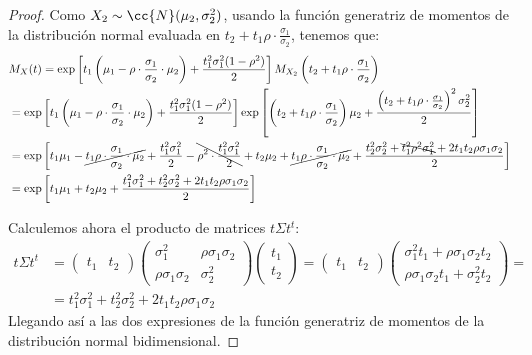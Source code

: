 \begin{proof}
    Como $X_2\sim \cc{N}(\mu_2, \sigma_2^2)$, usando la función generatriz de momentos de la distribución normal evaluada en $t_2+t_1\rho\cdot \frac{\sigma_1}{\sigma_2}$, tenemos que:
    \begin{align*}
        &
        M_X(t)= \exp\left[t_1\left(\mu_1-\rho\cdot \frac{\sigma_1}{\sigma_2}\cdot \mu_2\right)+\dfrac{t_1^2\sigma_1^2(1-\rho^2)}{2}\right]M_{X_2}\left(t_2+t_1\rho\cdot \frac{\sigma_1}{\sigma_2}\right)
        \\&= \exp\left[t_1\left(\mu_1-\rho\cdot \frac{\sigma_1}{\sigma_2}\cdot \mu_2\right)+\dfrac{t_1^2\sigma_1^2(1-\rho^2)}{2}\right]\exp\left[\left(t_2+t_1\rho\cdot \frac{\sigma_1}{\sigma_2}\right)\mu_2+\dfrac{\left(t_2+t_1\rho\cdot \frac{\sigma_1}{\sigma_2}\right)^2\sigma_2^2}{2}\right]
        \\&= \exp\left[t_1\mu_1-\cancel{t_1\rho\cdot \frac{\sigma_1}{\sigma_2}\cdot \mu_2}+\dfrac{t_1^2\sigma_1^2}{2}-\bcancel{\rho^2\cdot \dfrac{t_1^2\sigma_1^2}{2}}+t_2\mu_2+\cancel{t_1\rho\cdot \frac{\sigma_1}{\sigma_2}\cdot \mu_2}+\dfrac{t_2^2\sigma_2^2+\bcancel{t_1^2\rho^2\sigma_1^2}+2t_1t_2\rho\sigma_1\sigma_2}{2}\right]
        \\&= \exp\left[t_1\mu_1+t_2\mu_2+\dfrac{t_1^2\sigma_1^2+t_2^2\sigma_2^2+2t_1t_2\rho\sigma_1\sigma_2}{2}\right]
    \end{align*}

    Calculemos ahora el producto de matrices $t\Sigma t^t$:
    \begin{align*}
        t\Sigma t^t&=\begin{pmatrix}
            t_1 & t_2
        \end{pmatrix}\begin{pmatrix}
            \sigma_1^2 & \rho\sigma_1\sigma_2\\
            \rho\sigma_1\sigma_2 & \sigma_2^2
        \end{pmatrix}\begin{pmatrix}
            t_1\\
            t_2
        \end{pmatrix}
        = \begin{pmatrix}
            t_1 & t_2
        \end{pmatrix}\begin{pmatrix}
            \sigma_1^2t_1+\rho\sigma_1\sigma_2t_2\\
            \rho\sigma_1\sigma_2t_1+\sigma_2^2t_2
        \end{pmatrix}
        =\\&= t_1^2\sigma_1^2+t_2^2\sigma_2^2+2t_1t_2\rho\sigma_1\sigma_2
    \end{align*}
    Llegando así a las dos expresiones de la función generatriz de momentos de la distribución normal bidimensional.
\end{proof}



